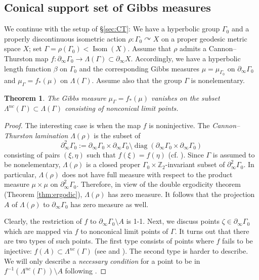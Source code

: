 \documentclass[12pt]{amsbook}%
\newtheorem{thm}{Theorem}[chapter]
\theoremstyle{definition}
\theoremstyle{remark}
\numberwithin{section}{chapter}
\numberwithin{subsection}{section}
\numberwithin{figure}{chapter}
\DeclareMathOperator{\Isom}{Isom}
\DeclareMathOperator{\acts}{\curvearrowright}
\DeclareMathOperator{\diag}{diag}
\def\bZ{{\mathbb{Z}}}
\def\Ga{\Gamma}
\def\La{\Lambda}
\def\geo{\partial_\infty}
\begin{document}
{{\subsection{Conical support set of Gibbs measures}\label{sec:conical}

We continue with the setup of \S \ref{sec:CT}: We have a hyperbolic group $\Ga_0$ and a properly discontinuous isometric action 
$\rho: \Ga_0\acts X$ on a proper geodesic metric space $X$; set $\Ga=\rho(\Ga_0)< \Isom(X)$.  
Assume that $\rho$ admits a Cannon--Thurston map $f: \geo \Ga_0\to \La(\Ga)\subset \geo X$. Accordingly, we have a hyperbolic length function $\beta$ on $\Ga_0$ and the corresponding Gibbs measures $\mu=\mu_{\Ga_0}$ on $\geo \Ga_0$ and $\mu_{\Ga}=f_*(\mu)$ on $\La(\Ga)$. Assume also that the group $\Ga$ is nonelementary.  

\begin{thm} \index{nonconical limit set $\La^{nc}(\Ga)$}
The Gibbs measure $\mu_\Ga=f_*(\mu)$ vanishes on the subset $\La^{nc}(\Ga)\subset \La(\Ga)$ consisting of nonconical limit points. 
\end{thm} 
\begin{proof} %
The interesting case is when the map $f$ is noninjective. The {\em Cannon--Thurston lamination} $\La(\rho)$ 
is the subset of 
$$
\geo^2 \Ga_0:= \geo \Ga_0\times \geo \Ga_0 \setminus \diag(\geo \Ga_0\times \geo \Ga_0)$$ 
consisting of pairs $(\xi,\eta)$ such that $f(\xi)=f(\eta)$ 
(cf. \cite{Mitra}). Since $\Ga$ is assumed to be nonelementary, $\La(\rho)$ is a closed proper $\Ga_0\times \bZ_2$-invariant subset of $\geo^2 \Ga_0$. In particular, $\La(\rho)$ does not have full measure with respect to the product measure $\mu\times \mu$ on $\geo^2 \Ga_0$. Therefore, in view of the double ergodicity theorem (Theorem \ref{thm:ergodic}), $\La(\rho)$ has zero measure. It follows that the projection $A$ of $\La(\rho)$ to $\geo \Ga_0$ has zero measure as well. 


\medskip 
Clearly, the restriction of $f$ to $\geo \Ga_0\setminus A$ is 1-1. 
 Next, we discuss points $\zeta\in \geo \Ga_0$ which are mapped via $f$ to nonconical limit points of $\Ga$. 
 It turns out that there are two types of such points. The first type consists of points where $f$ fails to be injective: 
 $f(A)\subset \La^{nc}(\Ga)$ (see \cite[\S 8]{Kapovich1995} and \cite[\S 7]{JKLO}). 
 The second type is harder to describe. We will only describe a {\em necessary condition} 
 for a point to be in $f^{-1}(\La^{nc}(\Ga))\setminus A$ following \cite{JKLO}. 



\end{proof}}}
\end{document}
